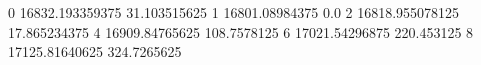 0 16832.193359375 31.103515625
1 16801.08984375 0.0
2 16818.955078125 17.865234375
4 16909.84765625 108.7578125
6 17021.54296875 220.453125
8 17125.81640625 324.7265625
